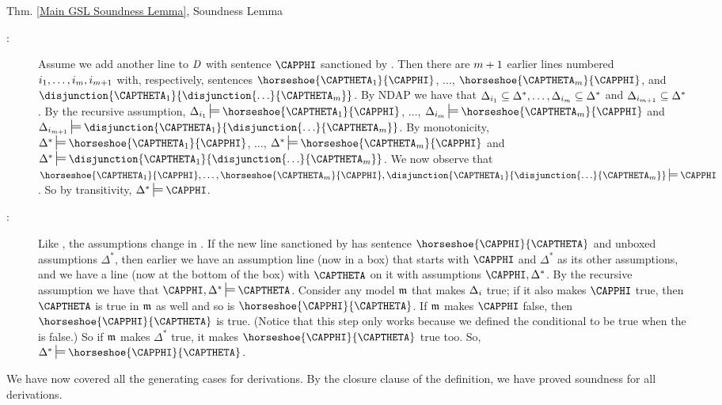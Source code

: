 \begin{PROOFOF}{Thm. \ref{Main GSL Soundness Lemma}, Soundness Lemma}
\begin{description}
\begin{description}
\item[:]
Assume we add another line to $\mathit{D}$ with sentence $\CAPPHI$ sanctioned by .
Then there are $m+1$ earlier lines numbered $i_{1},\ldots,i_{m},i_{m+1}$ with, respectively, sentences $\horseshoe{\CAPTHETA_1}{\CAPPHI}$, $\ldots$, $\horseshoe{\CAPTHETA_{\integer{m}}}{\CAPPHI}$, and  $\disjunction{\CAPTHETA_1}{\disjunction{\ldots}{\CAPTHETA_{\integer{m}}}}$.
By NDAP we have that $\Delta_{i_1}\subseteq\Delta^*,\ldots,\Delta_{i_m}\subseteq\Delta^*$ and $\Delta_{i_{m+1}}\subseteq\Delta^*$.
By the recursive assumption, $\Delta_{\integer{i}_1}\sdtstile{}{}\horseshoe{\CAPTHETA_1}{\CAPPHI}$, $\ldots$, $\Delta_{\integer{i}_\integer{m}}\sdtstile{}{}\horseshoe{\CAPTHETA_{\integer{m}}}{\CAPPHI}$ and $\Delta_{\integer{i}_{\integer{m}+1}}\sdtstile{}{}\disjunction{\CAPTHETA_1}{\disjunction{\ldots}{\CAPTHETA_{\integer{m}}}}$.
By monotonicity, $\Delta^*\sdtstile{}{}\horseshoe{\CAPTHETA_1}{\CAPPHI}$, $\ldots$, $\Delta^*\sdtstile{}{}\horseshoe{\CAPTHETA_{\integer{m}}}{\CAPPHI}$ and $\Delta^*\sdtstile{}{}\disjunction{\CAPTHETA_1}{\disjunction{\ldots}{\CAPTHETA_{\integer{m}}}}$.
We now observe that $\horseshoe{\CAPTHETA_1}{\CAPPHI},\ldots,\horseshoe{\CAPTHETA_{\integer{m}}}{\CAPPHI},\disjunction{\CAPTHETA_1}{\disjunction{\ldots}{\CAPTHETA_{\integer{m}}}}\sdtstile{}{}\CAPPHI$.
So by transitivity, $\Delta^*\sdtstile{}{}\CAPPHI$.

\item[:]
Like , the assumptions change in . 
If the new line sanctioned by  has sentence $\horseshoe{\CAPPHI}{\CAPTHETA}$ and unboxed assumptions $\Delta^*$, then earlier we have an assumption line (now in a box) that starts with $\CAPPHI$ and $\Delta^*$ as its other assumptions, and we have a line (now at the bottom of the box) with $\CAPTHETA$ on it with assumptions $\CAPPHI,\Delta^*$. 
By the recursive assumption we have that $\CAPPHI,\Delta^*\sdtstile{}{}\CAPTHETA$. 
Consider any model $\mathfrak{m}{}$ that makes $\Delta_{i}$ true;
if it also makes $\CAPPHI$ true, then $\CAPTHETA$ is true in $\mathfrak{m}{}$ as well and so is $\horseshoe{\CAPPHI}{\CAPTHETA}$. 
If $\mathfrak{m}{}$ makes $\CAPPHI$ false, then $\horseshoe{\CAPPHI}{\CAPTHETA}$ is true. 
(Notice that this step only works because we defined the conditional to be true when the  is false.)
So if $\mathfrak{m}{}$ makes $\Delta^*$ true, it makes $\horseshoe{\CAPPHI}{\CAPTHETA}$ true too. 
So, $\Delta^*\sdtstile{}{}\horseshoe{\CAPPHI}{\CAPTHETA}$.  

\end{description}
\item[Closure Step:] We have now covered all the generating cases for derivations. By the closure clause of the definition, we have proved soundness for all derivations. 
\end{description}
\end{PROOFOF} 

